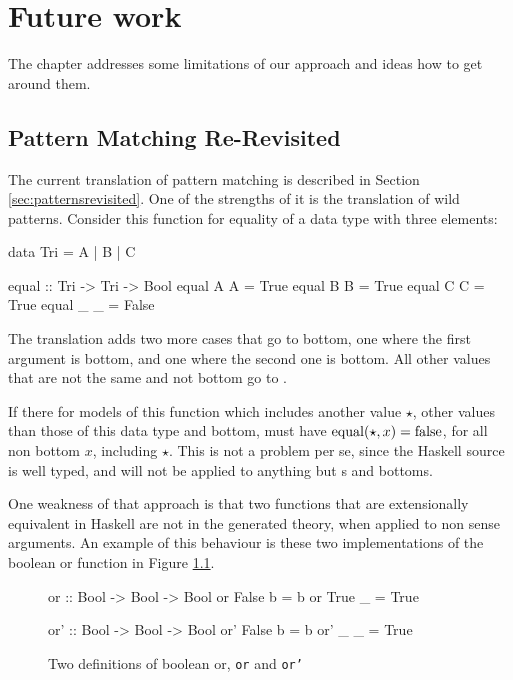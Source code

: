 \chapter{Future work}
\label{ch:future}

The chapter addresses some limitations of our approach and ideas how
to get around them.

\section{Pattern Matching Re-Revisited}
\label{sec:rerevisited}

The current translation of pattern matching is described in Section
\ref{sec:patternsrevisited}. One of the strengths of it is the
translation of wild patterns. Consider this function for equality of a
data type with three elements:

\begin{code}
data Tri = A | B | C

equal :: Tri -> Tri -> Bool
equal A A = True
equal B B = True
equal C C = True
equal _ _ = False
\end{code}

\noindent
The translation adds two more cases that go to bottom, one where the
first argument is bottom, and one where the second one is bottom. All
other values that are not the same  and not bottom go to
.

If there for models of this function which includes
another value $\star$, other values than those of this data type and
bottom, must have $\mathrm{equal}(\star,x) = \mathrm{false}$, for all non
bottom $x$, including $\star$. This is not a problem per se, since the
Haskell source is well typed, and  will not be applied to
anything but s and bottoms.

One weakness of that approach is that two functions that are
extensionally equivalent in Haskell are not in the generated theory,
when applied to non sense arguments. An example of this behaviour is
these two implementations of the boolean or function in Figure
\ref{code:or}.

\begin{figure}[h!]
\centering
\begin{minipage}[b]{6cm}
\begin{code}
or :: Bool -> Bool -> Bool
or False b = b
or True  _ = True
\end{code}
\end{minipage}
\hspace{10pt}
\begin{minipage}[b]{6cm}
\begin{code}
or' :: Bool -> Bool -> Bool
or' False b = b
or' _     _ = True
\end{code}
\end{minipage}
\caption{Two definitions of boolean or, \texttt{or} and \texttt{or'}
\label{code:or}
}
\end{figure}

